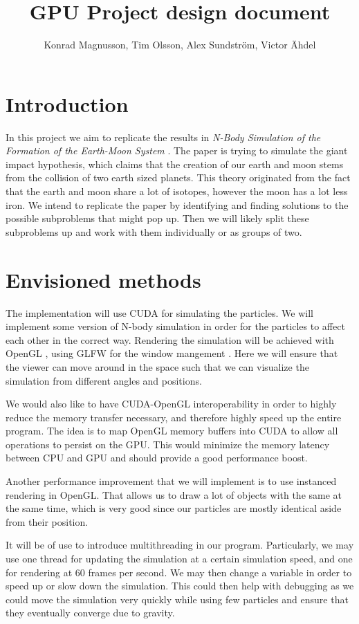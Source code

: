 \documentclass[a4paper]{article}
\title{GPU Project design document}
\author{Konrad Magnusson, Tim Olsson, Alex Sundström, Victor Ähdel}
\begin{document}
\maketitle

\section{Introduction}

In this project we aim to replicate the results in \emph{N-Body Simulation of the Formation of the Earth-Moon System} \cite{simulation_paper}.
The paper is trying to simulate the giant impact hypothesis, which claims that the creation of our earth and moon stems from the collision of two earth sized planets.
This theory originated from the fact that the earth and moon share a lot of isotopes, however the moon has a lot less iron. 
We intend to replicate the paper by identifying and finding solutions to the possible subproblems that might pop up.
Then we will likely split these subproblems up and work with them individually or as groups of two.

\section{Envisioned methods}

The implementation will use CUDA \cite{Cuda} for simulating the particles.
We will implement some version of N-body simulation in order for the particles to affect each other in the correct way.
Rendering the simulation will be achieved with OpenGL \cite{opengl}, using GLFW for the window mangement \cite{glfw}. 
Here we will ensure that the viewer can move around in the space such that we can visualize the simulation from different angles and positions.

We would also like to have CUDA-OpenGL interoperability in order to highly reduce the memory transfer necessary, and therefore highly speed up the entire program.
The idea is to map OpenGL memory buffers into CUDA to allow all operations to persist on the GPU.
This would minimize the memory latency between CPU and GPU and should provide a good performance boost.

Another performance improvement that we will implement is to use instanced rendering in OpenGL.
That allows us to draw a lot of objects with the same at the same time, which is very good since our particles are mostly identical aside from their position.

It will be of use to introduce multithreading in our program. 
Particularly, we may use one thread for updating the simulation at a certain simulation speed, and one for rendering at 60 frames per second.
We may then change a variable in order to speed up or slow down the simulation.
This could then help with debugging as we could move the simulation very quickly while using few particles and ensure that they eventually converge due to gravity.
\end{document}
